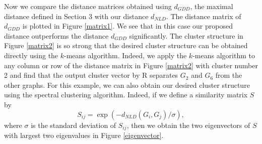 \documentclass{amsart}
\begin{document}
	
%	
	
	

	
	Now we compare the distance matrices obtained using $d_{GDD}$, the maximal distance defined in Section 3 with our distance $d_{NLD}$. The distance matrix of $d_{GDD}$ is plotted in Figure \ref{matrix1}. 
	We see that in this case our proposed distance outperforms the distance $d_{GDD}$ significantly.
	The cluster structure in Figure \ref{matrix2} is so strong that the desired cluster structure can be obtained directly using the $k$-means algorithm. Indeed, we apply the $k$-means algorithm to any column or row of the distance matrix in Figure \ref{matrix2} with cluster number 2 and find that the output cluster vector by \textsf{R} separates $G_2$ and $G_6$ from the other graphs. For this example, we can also obtain our desired cluster structure using the spectral clustering algorithm. Indeed, if we define a similarity matrix $S$ by 
	\begin{equation}\label{similarity}
	S_{ij}=\exp(-d_{NLD}(G_i,G_j)/\sigma),
	\end{equation}
    where $\sigma$ is the standard deviation of $S_{ij}$, then we obtain the two eigenvectors of $S$ with largest two eigenvalues in Figure \ref{eigenvector}.
   	
\end{document}
